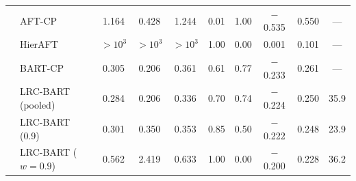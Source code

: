 \begin{longtable}{llcccccccc}
\midrule
{} & AFT-CP & 1.164 & 0.428 & 1.244 & 0.01 & 1.00 & $-$0.535 & 0.550 & --- \\*
& HierAFT & $>\!10^{3}$ & $>\!10^{3}$ & $>\!10^{3}$ & 1.00 & 0.00 & 0.001 & 0.101 & --- \\*
& BART-CP & 0.305 & 0.206 & 0.361 & 0.61 & 0.77 & $-$0.233 & 0.261 & --- \\*
& LRC-BART (pooled) & 0.284 & 0.206 & 0.336 & 0.70 & 0.74 & $-$0.224 & 0.250 & 35.9 \\*
& LRC-BART (0.9) & 0.301 & 0.350 & 0.353 & 0.85 & 0.50 & $-$0.222 & 0.248 & 23.9 \\*
& LRC-BART ($w=0.9$) & 0.562 & 2.419 & 0.633 & 1.00 & 0.00 & $-$0.200 & 0.228 & 36.2 \\
\end{longtable}
\endgroup
